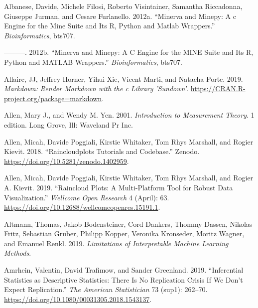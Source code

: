 \documentclass[
]{book}
\newlength{\cslhangindent}
\newenvironment{cslreferences}%
  {\setlength{\parindent}{0pt}%
  \everypar{\setlength{\hangindent}{\cslhangindent}}\ignorespaces}%
  {\par}
\begin{document}
\hypertarget{refs}{}
\begin{cslreferences}
\leavevmode\hypertarget{ref-R-minerva}{}%
Albanese, Davide, Michele Filosi, Roberto Visintainer, Samantha Riccadonna, Giuseppe Jurman, and Cesare Furlanello. 2012a. ``Minerva and Minepy: A c Engine for the Mine Suite and Its R, Python and Matlab Wrappers.'' \emph{Bioinformatics}, bts707.

\leavevmode\hypertarget{ref-albaneseMinervaMinepyEngine2012}{}%
---------. 2012b. ``Minerva and Minepy: A C Engine for the MINE Suite and Its R, Python and MATLAB Wrappers.'' \emph{Bioinformatics}, bts707.

\leavevmode\hypertarget{ref-R-markdown}{}%
Allaire, JJ, Jeffrey Horner, Yihui Xie, Vicent Marti, and Natacha Porte. 2019. \emph{Markdown: Render Markdown with the c Library 'Sundown'}. \url{https://CRAN.R-project.org/package=markdown}.

\leavevmode\hypertarget{ref-allenIntroductionMeasurementTheory2001}{}%
Allen, Mary J., and Wendy M. Yen. 2001. \emph{Introduction to Measurement Theory}. 1 edition. Long Grove, Ill: Waveland Pr Inc.

\leavevmode\hypertarget{ref-allenRaincloudplotsTutorialsCodebase2018}{}%
Allen, Micah, Davide Poggiali, Kirstie Whitaker, Tom Rhys Marshall, and Rogier Kievit. 2018. ``Raincloudplots Tutorials and Codebase.'' Zenodo. \url{https://doi.org/10.5281/zenodo.1402959}.

\leavevmode\hypertarget{ref-allenRaincloudPlotsMultiplatform2019}{}%
Allen, Micah, Davide Poggiali, Kirstie Whitaker, Tom Rhys Marshall, and Rogier A. Kievit. 2019. ``Raincloud Plots: A Multi-Platform Tool for Robust Data Visualization.'' \emph{Wellcome Open Research} 4 (April): 63. \url{https://doi.org/10.12688/wellcomeopenres.15191.1}.

\leavevmode\hypertarget{ref-altmannLimitationsInterpretableMachine2019}{}%
Altmann, Thomas, Jakob Bodensteiner, Cord Dankers, Thommy Dassen, Nikolas Fritz, Sebastian Gruber, Philipp Kopper, Veronika Kronseder, Moritz Wagner, and Emanuel Renkl. 2019. \emph{Limitations of Interpretable Machine Learning Methods}.

\leavevmode\hypertarget{ref-amrheinInferentialStatisticsDescriptive2019}{}%
Amrhein, Valentin, David Trafimow, and Sander Greenland. 2019. ``Inferential Statistics as Descriptive Statistics: There Is No Replication Crisis If We Don't Expect Replication.'' \emph{The American Statistician} 73 (sup1): 262--70. \url{https://doi.org/10.1080/00031305.2018.1543137}.


\end{cslreferences}
\end{document}
